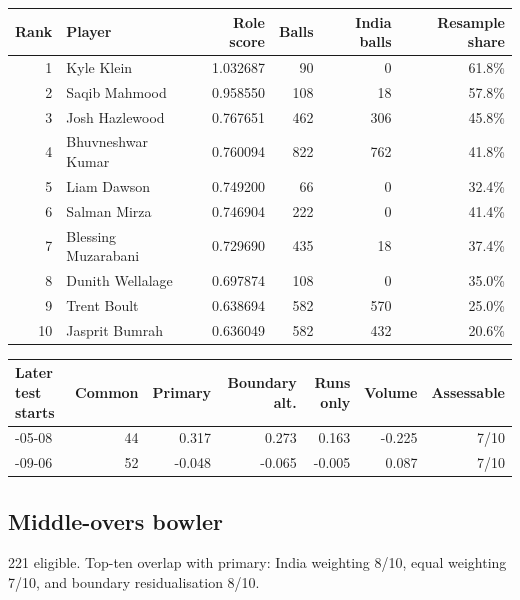 \begin{center}
\begin{tabularx}{\linewidth}{r>{\raggedright\arraybackslash}Xrrrr}
\toprule
Rank & Player & Role score & Balls & India balls & Resample share \\
\midrule
1 & Kyle Klein & 1.032687 & 90 & 0 & 61.8\% \\
2 & Saqib Mahmood & 0.958550 & 108 & 18 & 57.8\% \\
3 & Josh Hazlewood & 0.767651 & 462 & 306 & 45.8\% \\
4 & Bhuvneshwar Kumar & 0.760094 & 822 & 762 & 41.8\% \\
5 & Liam Dawson & 0.749200 & 66 & 0 & 32.4\% \\
6 & Salman Mirza & 0.746904 & 222 & 0 & 41.4\% \\
7 & Blessing Muzarabani & 0.729690 & 435 & 18 & 37.4\% \\
8 & Dunith Wellalage & 0.697874 & 108 & 0 & 35.0\% \\
9 & Trent Boult & 0.638694 & 582 & 570 & 25.0\% \\
10 & Jasprit Bumrah & 0.636049 & 582 & 432 & 20.6\% \\
\bottomrule
\end{tabularx}
\end{center}

\begin{center}
\begin{tabularx}{\linewidth}{>{\raggedright\arraybackslash}Xrrrrrr}
\toprule
Later test starts & Common & Primary & Boundary alt. & Runs only & Volume & Assessable \\
\midrule
2024-05-08 & 44 & 0.317 & 0.273 & 0.163 & -0.225 & 7/10 \\
2025-09-06 & 52 & -0.048 & -0.065 & -0.005 & 0.087 & 7/10 \\
\bottomrule
\end{tabularx}
\end{center}

\subsection{Middle-overs bowler}

221 eligible. Top-ten overlap with primary: India weighting 8/10, equal weighting 7/10, and boundary residualisation 8/10.

